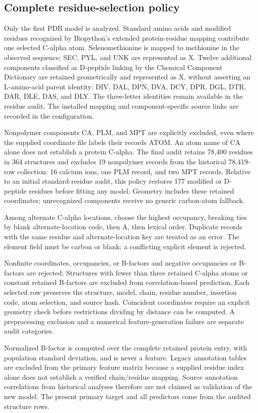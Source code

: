 \subsection{Complete residue-selection policy}
\label{sec:identity_details}
Only the first PDB model is analyzed. Standard amino acids and modified residues recognized by Biopython's extended protein-residue mapping contribute one selected C-alpha atom. Selenomethionine is mapped to methionine in the observed sequence; SEC, PYL, and UNK are represented as X. Twelve additional components classified as D-peptide linking by the Chemical Component Dictionary \citep{ccd} are retained geometrically and represented as X, without asserting an L-amino-acid parent identity: DIV, DAL, DPN, DVA, DCY, DPR, DGL, DTR, DAR, DLE, DAS, and DLY. The three-letter identities remain available in the residue audit. The installed mapping and component-specific source links are recorded in the configuration.

Nonpolymer components CA, PLM, and MPT are explicitly excluded, even where the supplied coordinate file labels their records ATOM. An atom name of CA alone does not establish a protein C-alpha. The final audit retains 78,400 residues in 364 structures and excludes 19 nonpolymer records from the historical 78,419-row collection: 16 calcium ions, one PLM record, and two MPT records. Relative to an initial standard-residue audit, this policy restores 177 modified or D-peptide residues before fitting any model. Geometry includes these retained coordinates; unrecognized components receive no generic carbon-atom fallback.

Among alternate C-alpha locations, choose the highest occupancy, breaking ties by blank alternate-location code, then A, then lexical order. Duplicate records with the same residue and alternate-location key are treated as an error. The element field must be carbon or blank; a conflicting explicit element is rejected.

Nonfinite coordinates, occupancies, or B-factors and negative occupancies or B-factors are rejected. Structures with fewer than three retained C-alpha atoms or constant retained B-factors are excluded from correlation-based prediction. Each selected row preserves the structure, model, chain, residue number, insertion code, atom selection, and source hash. Coincident coordinates require an explicit geometry check before restrictions dividing by distance can be computed. A preprocessing exclusion and a numerical feature-generation failure are separate audit categories.

Normalized B-factor is computed over the complete retained protein entry, with population standard deviation, and is never a feature. Legacy annotation tables are excluded from the primary feature matrix because a supplied residue index alone does not establish a verified chain/residue mapping. Source annotation correlations from historical analyses therefore are not claimed as validation of the new model. The present primary target and all predictors come from the audited structure rows.
